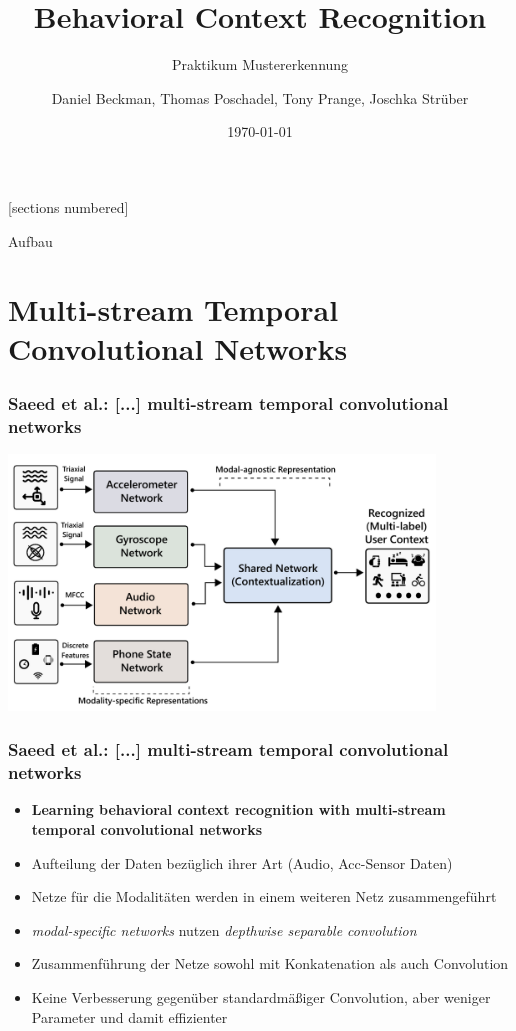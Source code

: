 \documentclass[10pt,%
	wide,%
	xcolor={x11names},%
	hyperref={colorlinks},%
	pantone312,%
	handout,%
	]{beamer}
\author{Daniel Beckman, Thomas Poschadel, Tony Prange, Joschka Strüber}
\title{Behavioral Context Recognition}
\subtitle{Praktikum Mustererkennung}
\date{\today}
\begin{document}
[sections numbered]

\begin{frame}[plain]
  \maketitle
\end{frame}

\begin{frame}[t]{Aufbau}
\end{frame}

\section{Multi-stream Temporal Convolutional Networks}

\begin{frame}
\frametitle{Saeed et al.: [...] multi-stream temporal convolutional networks}
\begin{center}
	\includegraphics[width=0.85\textwidth]{img/multi-modal-network.png}
\end{center}
\end{frame}

\begin{frame}
\frametitle{Saeed et al.: [...] multi-stream temporal convolutional networks}
\begin{itemize}
\item \textbf{Learning behavioral context recognition with multi-stream temporal convolutional networks} \cite{saeed2018learning}
\item Aufteilung der Daten bezüglich ihrer Art (Audio, Acc-Sensor Daten)
\item Netze für die Modalitäten werden in einem weiteren Netz zusammengeführt
\item \emph{modal-specific networks} nutzen \emph{depthwise separable convolution}
\item Zusammenführung der Netze sowohl mit Konkatenation als auch Convolution
\item Keine Verbesserung gegenüber standardmäßiger Convolution, aber weniger Parameter und damit effizienter
\end{itemize}
\end{frame}
\end{document}
